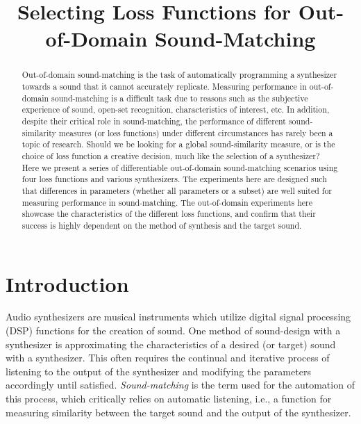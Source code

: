 \documentclass{article} %
\title{Selecting Loss Functions for Out-of-Domain Sound-Matching}
\begin{document}
\address{University of Alberta}

\maketitle


\begin{abstract}
 Out-of-domain sound-matching is the task of automatically programming a synthesizer towards a sound that it cannot accurately replicate. Measuring performance in out-of-domain sound-matching is a difficult task due to reasons such as the subjective experience of sound, open-set recognition, characteristics of interest, etc. In addition, despite their critical role in sound-matching, the performance of different sound-similarity measures (or loss functions) under different circumstances has rarely been a topic of research. Should we be looking for a global sound-similarity measure, or is the choice of loss function a creative decision, much like the selection of a synthesizer?
 Here we present a series of differentiable out-of-domain sound-matching scenarios using four loss functions and various synthesizers. The experiments here are designed such that differences in parameters (whether all parameters or a subset) are well suited for measuring performance in sound-matching. The out-of-domain experiments here showcase the characteristics of the different loss functions, and confirm that their success is highly dependent on the method of synthesis and the target sound. 
\end{abstract}

\section{Introduction}
Audio synthesizers are musical instruments which utilize digital signal processing (DSP) functions for the creation of sound.  One method of sound-design with a synthesizer is approximating the characteristics of a desired (or target) sound with a synthesizer. This often requires the continual and iterative process of listening to the output of the synthesizer and modifying the parameters accordingly until satisfied. \textit{Sound-matching} is the term used for the automation of this process, which critically relies on automatic listening, i.e., a function for measuring similarity between the target sound and the output of the synthesizer. 
\end{document}
